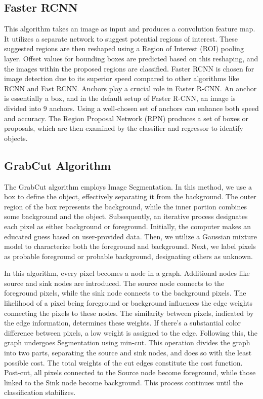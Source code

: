 \documentclass[12pt, a4paper, twoside]{article}
\begin{document}
\subsection{Faster RCNN}
This algorithm takes an image as input and produces a convolution feature map. It utilizes a separate network to suggest potential regions of interest. These suggested regions are then reshaped using a Region of Interest (ROI) pooling layer. Offset values for bounding boxes are predicted based on this reshaping, and the images within the proposed regions are classified. Faster RCNN is chosen for image detection due to its superior speed compared to other algorithms like RCNN and Fast RCNN. Anchors play a crucial role in Faster R-CNN. An anchor is essentially a box, and in the default setup of Faster R-CNN, an image is divided into 9 anchors. Using a well-chosen set of anchors can enhance both speed and accuracy. The Region Proposal Network (RPN) produces a set of boxes or proposals, which are then examined by the classifier and regressor to identify objects.

\subsection{GrabCut Algorithm}
The GrabCut algorithm employs Image Segmentation. In this method, we use a box to define the object, effectively separating it from the background. The outer region of the box represents the background, while the inner portion combines some background and the object. Subsequently, an iterative process designates each pixel as either background or foreground. Initially, the computer makes an educated guess based on user-provided data. Then, we utilize a Gaussian mixture model to characterize both the foreground and background. Next, we label pixels as probable foreground or probable background, designating others as unknown.
\par
In this algorithm, every pixel becomes a node in a graph. Additional nodes like source and sink nodes are introduced. The source node connects to the foreground pixels, while the sink node connects to the background pixels. The likelihood of a pixel being foreground or background influences the edge weights connecting the pixels to these nodes. The similarity between pixels, indicated by the edge information, determines these weights. If there's a substantial color difference between pixels, a low weight is assigned to the edge. Following this, the graph undergoes Segmentation using min-cut. This operation divides the graph into two parts, separating the source and sink nodes, and does so with the least possible cost. The total weights of the cut edges constitute the cost function. Post-cut, all pixels connected to the Source node become foreground, while those linked to the Sink node become background. This process continues until the classification stabilizes.
\end{document}
